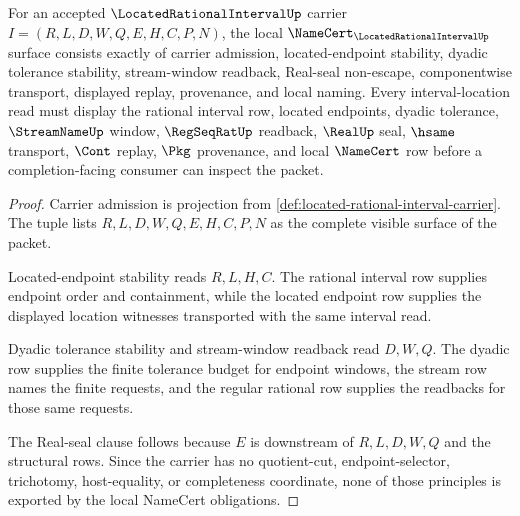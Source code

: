 \begin{theorem}
\label{thm:located-rational-interval-namecert-obligations}
For an accepted $\LocatedRationalIntervalUp$ carrier $I=(R,L,D,W,Q,E,H,C,P,N)$, the local $\NameCert_{\LocatedRationalIntervalUp}$ surface consists exactly of carrier admission, located-endpoint stability, dyadic tolerance stability, stream-window readback, Real-seal non-escape, componentwise transport, displayed replay, provenance, and local naming. Every interval-location read must display the rational interval row, located endpoints, dyadic tolerance, $\StreamNameUp$ window, $\RegSeqRatUp$ readback, $\RealUp$ seal, $\hsame$ transport, $\Cont$ replay, $\Pkg$ provenance, and local $\NameCert$ row before a completion-facing consumer can inspect the packet.
\end{theorem}
\begin{proof}
Carrier admission is projection from \autoref{def:located-rational-interval-carrier}. The tuple lists $R,L,D,W,Q,E,H,C,P,N$ as the complete visible surface of the packet.

Located-endpoint stability reads $R,L,H,C$. The rational interval row supplies endpoint order and containment, while the located endpoint row supplies the displayed location witnesses transported with the same interval read.

Dyadic tolerance stability and stream-window readback read $D,W,Q$. The dyadic row supplies the finite tolerance budget for endpoint windows, the stream row names the finite requests, and the regular rational row supplies the readbacks for those same requests.

The Real-seal clause follows because $E$ is downstream of $R,L,D,W,Q$ and the structural rows. Since the carrier has no quotient-cut, endpoint-selector, trichotomy, host-equality, or completeness coordinate, none of those principles is exported by the local NameCert obligations.
\end{proof}

